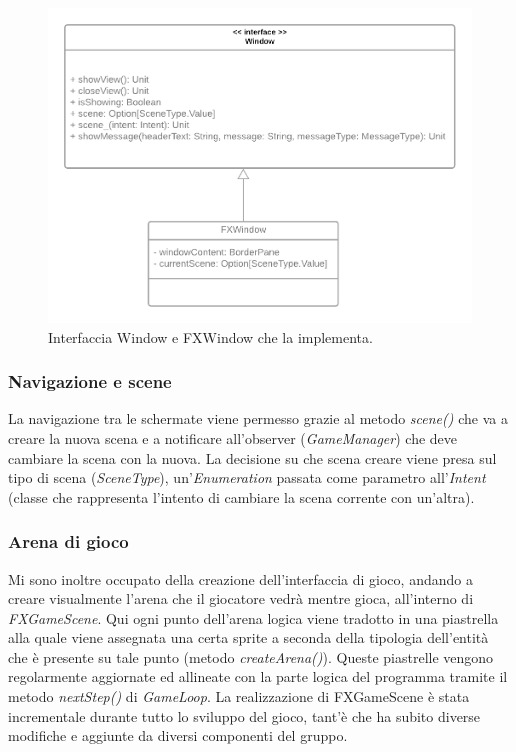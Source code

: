\begin{figure}[H]
  \includegraphics[width=15cm]{../res/6-implementazione/chiana/UML_Window.png}
  \caption{Interfaccia Window e FXWindow che la implementa.}
  \label{windowClass}
\end{figure}

\subsubsection{Navigazione e scene}
La navigazione tra le schermate viene permesso grazie al metodo \textit{scene\textunderscore()} che va a creare la nuova scena e a notificare all'observer (\textit{GameManager}) che deve cambiare la scena con la nuova.
La decisione su che scena creare viene presa sul tipo di scena (\textit{SceneType}), un'\textit{Enumeration} passata come parametro all'\textit{Intent} (classe che rappresenta l'intento di cambiare la scena corrente con un'altra).

\subsubsection{Arena di gioco}
Mi sono inoltre occupato della creazione dell'interfaccia di gioco, andando a creare visualmente l'arena che il giocatore vedrà mentre gioca, all'interno di \textit{FXGameScene}.
Qui ogni punto dell'arena logica viene tradotto in una piastrella alla quale viene assegnata una certa sprite a seconda della tipologia dell'entità che è presente su tale punto (metodo \textit{createArena()}).
Queste piastrelle vengono regolarmente aggiornate ed allineate con la parte logica del programma tramite il metodo \textit{nextStep()} di \textit{GameLoop}.
La realizzazione di FXGameScene è stata incrementale durante tutto lo sviluppo del gioco, tant'è che ha subito diverse modifiche e aggiunte da diversi componenti del gruppo.


